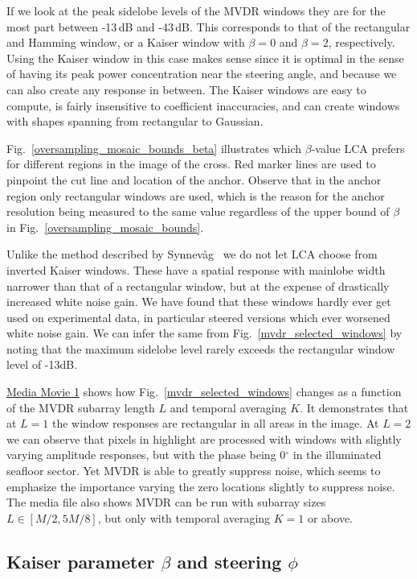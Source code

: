 \documentclass[10pt,journal,draftclsnofoot,onecolumn]{IEEEtran}
\newcommand\Fig[1]{Fig.~\ref{#1}}
\newcommand\1{\vec 1}
\newcommand\multimedia[2]{\href{#1}{#2}}
\newcommand\mediaPath{gfx/media}
\newcommand\mediaI{\multimedia{\mediaPath/media1.mp4}{Media Movie 1}}
\begin{document}
If we look at the peak sidelobe levels of the MVDR windows they are for the most part between -13\,dB and -43\,dB. This corresponds to that of the rectangular and Hamming window, or a Kaiser window with $\beta=0$ and $\beta=2$, respectively. Using the Kaiser window in this case makes sense since it is optimal in the sense of having its peak power concentration near the steering angle, and because we can also create any response in between. The Kaiser windows are easy to compute, is fairly insensitive to coefficient inaccuracies, and can create windows with shapes spanning from rectangular to Gaussian.

\Fig{oversampling_mosaic_bounds_beta} illustrates which $\beta$-value LCA prefers for different regions in the image of the cross. Red marker lines are used to pinpoint the cut line and location of the anchor. Observe that in the anchor region only rectangular windows are used, which is the reason for the anchor resolution being measured to the same value regardless of the upper bound of $\beta$ in \Fig{oversampling_mosaic_bounds}. 

Unlike the method described by Synnev\aa{}g~\cite{Synnevag2008} we do not let LCA choose from  inverted Kaiser windows. These have a spatial response with mainlobe width narrower than that of a rectangular window, but at the expense of drastically increased white noise gain. We have found that these windows hardly ever get used on experimental data, in particular steered versions which ever worsened white noise gain. We can infer the same from \Fig{mvdr_selected_windows} by noting that the maximum sidelobe level rarely exceeds the rectangular window level of -13\;dB.

\mediaI{} shows how \Fig{mvdr_selected_windows} changes as a function of the MVDR subarray length $L$ and temporal averaging $K$. It demonstrates that at $L=1$ the window responses are rectangular in all areas in the image. At $L=2$ we can observe that pixels in highlight are processed with windows with slightly varying amplitude responses, but with the phase being 0$^\circ$ in the illuminated seafloor sector. Yet MVDR is able to greatly suppress noise, which seems to emphasize the importance varying the zero locations slightly to suppress noise. The media file also shows MVDR can be run with subarray sizes $L\in[M/2,5M/8]$, but only with temporal averaging $K=1$ or above.



\subsection{Kaiser parameter $\beta$ and steering $\phi$}\label{lca_kaiser_parameters}
\end{document}
